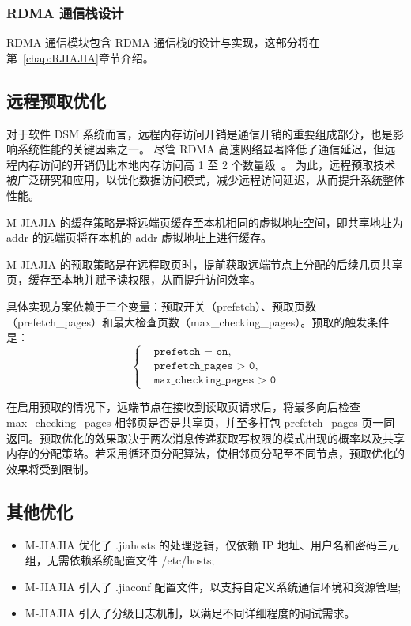 {\begin{enumerate}[label=\arabic*.]
    \end{enumerate}

    \subsubsection{RDMA 通信栈设计}
    RDMA 通信模块包含 RDMA 通信栈的设计与实现，这部分将在第~\ref{chap:RJIAJIA}章节介绍。

    \subsection{远程预取优化}
    对于软件 DSM 系统而言，远程内存访问开销是通信开销的重要组成部分，也是影响系统性能的关键因素之一。
    尽管 RDMA 高速网络显著降低了通信延迟，但远程内存访问的开销仍比本地内存访问高 1 至 2 个数量级~\citep{cai2018gam}。
    为此，远程预取技术被广泛研究和应用，以优化数据访问模式，减少远程访问延迟，从而提升系统整体性能。

    M-JIAJIA 的缓存策略是将远端页缓存至本机相同的虚拟地址空间，即共享地址为 addr 的远端页将在本机的 addr 虚拟地址上进行缓存。

    M-JIAJIA 的预取策略是在远程取页时，提前获取远端节点上分配的后续几页共享页，缓存至本地并赋予读权限，从而提升访问效率。

    具体实现方案依赖于三个变量：预取开关（prefetch）、预取页数（prefetch\_pages）和最大检查页数（max\_checking\_pages）。预取的触发条件是：
    $$
        \left\{
        \begin{aligned}
             & \texttt{prefetch = on},           \\
             & \texttt{prefetch\_pages > 0},     \\
             & \texttt{max\_checking\_pages > 0}
        \end{aligned}
        \right.
    $$

    在启用预取的情况下，远端节点在接收到读取页请求后，将最多向后检查 max\_checking\_pages 相邻页是否是共享页，并至多打包 prefetch\_pages 页一同返回。预取优化的效果取决于两次消息传递获取写权限的模式出现的概率以及共享内存的分配策略。若采用循环页分配算法，使相邻页分配至不同节点，预取优化的效果将受到限制。


    \subsection{其他优化}
    \begin{itemize}
        \item M-JIAJIA 优化了 .jiahosts 的处理逻辑，仅依赖 IP 地址、用户名和密码三元组，无需依赖系统配置文件 /etc/hosts;
        \item M-JIAJIA 引入了 .jiaconf 配置文件，以支持自定义系统通信环境和资源管理;
        \item M-JIAJIA 引入了分级日志机制，以满足不同详细程度的调试需求。
    \end{itemize}

}
